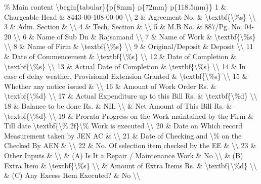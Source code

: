 \% Main content
\textbackslash{}begin\{tabular\}\{p\{8mm\} p\{72mm\} p\{118.5mm\}\}
1 \& Chargeable Head \& 8443-00-108-00-00 \textbackslash{}\textbackslash{}
2 \& Agreement No. \& \textbackslash{}textbf\{\textbackslash{}\%s\} \textbackslash{}\textbackslash{}
3 \& Adm. Section \& \textbackslash{}\textbackslash{}
4 \& Tech. Section \& \textbackslash{}\textbackslash{}
5 \& M.B No. \& 887/Pg. No. 04-20 \textbackslash{}\textbackslash{}
6 \& Name of Sub Dn \& Rajsamand \textbackslash{}\textbackslash{}
7 \& Name of Work \& \textbackslash{}textbf\{\textbackslash{}\%s\} \textbackslash{}\textbackslash{}
8 \& Name of Firm \& \textbackslash{}textbf\{\textbackslash{}\%s\} \textbackslash{}\textbackslash{}
9 \& Original/Deposit \& Deposit \textbackslash{}\textbackslash{}
11 \& Date of Commencement \& \textbackslash{}textbf\{\textbackslash{}\%s\} \textbackslash{}\textbackslash{}
12 \& Date of Completion \& \textbackslash{}textbf\{\textbackslash{}\%s\} \textbackslash{}\textbackslash{}
13 \& Actual Date of Completion \& \textbackslash{}textbf\{\textbackslash{}\%s\} \textbackslash{}\textbackslash{}
14 \& In case of delay weather, Provisional Extension Granted \& \textbackslash{}textbf\{\textbackslash{}\%s\} \textbackslash{}\textbackslash{}
15 \& Whether any notice issued \& \textbackslash{}\textbackslash{}
16 \& Amount of Work Order Rs. \& \textbackslash{}textbf\{\textbackslash{}\%d\} \textbackslash{}\textbackslash{}
17 \& Actual Expenditure up to this Bill Rs. \& \textbackslash{}textbf\{\textbackslash{}\%d\} \textbackslash{}\textbackslash{}
18 \& Balance to be done Rs. \& NIL \textbackslash{}\textbackslash{}
\& Net Amount of This Bill Rs. \& \textbackslash{}textbf\{\textbackslash{}\%d\} \textbackslash{}\textbackslash{}
19 \& Prorata Progress on the Work maintained by the Firm \& Till date \textbackslash{}textbf\{\textbackslash{}\%.2f\}\textbackslash{}\% Work is executed \textbackslash{}\textbackslash{}
20 \& Date on Which record Measurement taken by JEN AC \& \textbackslash{}\textbackslash{}
21 \& Date of Checking and \textbackslash{}\% on the Checked By AEN \& \textbackslash{}\textbackslash{}
22 \& No. Of selection item checked by the EE \& \textbackslash{}\textbackslash{}
23 \& Other Inputs \& \textbackslash{}\textbackslash{}
\& (A) Is It a Repair / Maintenance Work \& No \textbackslash{}\textbackslash{}
\& (B) Extra Item \& \textbackslash{}textbf\{\textbackslash{}\%s\} \textbackslash{}\textbackslash{}
\& Amount of Extra Items Rs. \& \textbackslash{}textbf\{\textbackslash{}\%d\} \textbackslash{}\textbackslash{}
\& (C) Any Excess Item Executed? \& No \textbackslash{}\textbackslash{}
